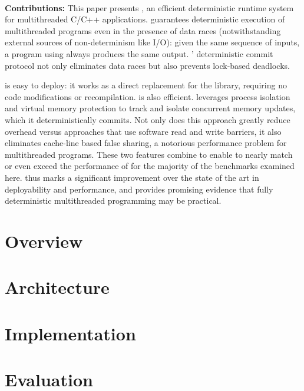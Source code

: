 \hspace{1em} \\
\noindent
\textbf{Contributions:}
This paper presents \textbf{\dthreads{}}, an efficient deterministic runtime system for multithreaded C/C++ applications. \dthreads{} guarantees deterministic execution of multithreaded programs even in the presence of data races (notwithstanding external sources of non-determinism
like I/O): given the same sequence of inputs, a program
using \dthreads{} always produces the same output. \dthreads{}'
deterministic commit protocol not only eliminates data races but also prevents lock-based deadlocks.

\dthreads{} is easy to deploy: it works as a direct replacement for the \pthreads{} library, requiring no code modifications or
recompilation. \dthreads{} is also efficient. \dthreads{} leverages process isolation and virtual memory protection to track and isolate concurrent memory updates, which it deterministically commits. Not only does this approach greatly reduce overhead versus approaches that use software read and write barriers, it also eliminates cache-line based false sharing, a notorious performance problem for multithreaded
programs. These two features combine to enable \dthreads{} to nearly match or even exceed the performance of \pthreads{} for the majority of the benchmarks examined here. \dthreads{} thus marks a significant improvement over the state of the art in deployability and performance, and provides promising evidence that fully deterministic multithreaded programming may be practical.

\section{\dthreads{} Overview}


\section{\dthreads{} Architecture}


\section{\dthreads{} Implementation}


\section{Evaluation}

